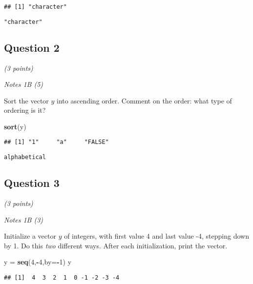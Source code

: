 \documentclass[
]{article}
\newenvironment{Shaded}{\begin{snugshade}}{\end{snugshade}}
\newcommand{\DataTypeTok}[1]{\textcolor[rgb]{0.13,0.29,0.53}{#1}}
\newcommand{\DecValTok}[1]{\textcolor[rgb]{0.00,0.00,0.81}{#1}}
\newcommand{\KeywordTok}[1]{\textcolor[rgb]{0.13,0.29,0.53}{\textbf{#1}}}
\newcommand{\NormalTok}[1]{#1}
\newcommand{\OperatorTok}[1]{\textcolor[rgb]{0.81,0.36,0.00}{\textbf{#1}}}
\newcommand{\StringTok}[1]{\textcolor[rgb]{0.31,0.60,0.02}{#1}}
\begin{document}
\begin{verbatim}
## [1] "character"
\end{verbatim}

\begin{verbatim}
"character"
\end{verbatim}

\hypertarget{question-2}{%
\subsection{Question 2}\label{question-2}}

\emph{(3 points)}

\emph{Notes 1B (5)}

Sort the vector \(y\) into ascending order. Comment on the order: what
type of ordering is it?

\begin{Shaded}
\begin{Highlighting}[]
\KeywordTok{sort}\NormalTok{(y)}
\end{Highlighting}
\end{Shaded}

\begin{verbatim}
## [1] "1"     "a"     "FALSE"
\end{verbatim}

\begin{verbatim}
alphabetical
\end{verbatim}

\hypertarget{question-3}{%
\subsection{Question 3}\label{question-3}}

\emph{(3 points)}

\emph{Notes 1B (3)}

Initialize a vector \(y\) of integers, with first value 4 and last value
-4, stepping down by 1. Do this \emph{two} different ways. After each
initialization, print the vector.

\begin{Shaded}
\begin{Highlighting}[]
\NormalTok{y =}\StringTok{ }\KeywordTok{seq}\NormalTok{(}\DecValTok{4}\NormalTok{,}\OperatorTok{-}\DecValTok{4}\NormalTok{,}\DataTypeTok{by=}\OperatorTok{-}\DecValTok{1}\NormalTok{)}
\NormalTok{y}
\end{Highlighting}
\end{Shaded}

\begin{verbatim}
## [1]  4  3  2  1  0 -1 -2 -3 -4
\end{verbatim}
\end{document}
